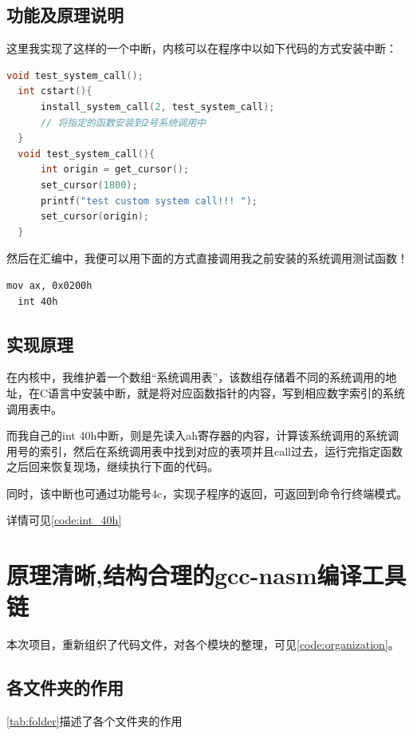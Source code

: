 \documentclass[forprint]{WHUBachelor}
\begin{document}
\subsection{功能及原理说明}

这里我实现了这样的一个中断，内核可以在程序中以如下代码的方式安装中断：
\begin{lstlisting}[language=c]
  void test_system_call();
  int cstart(){
      install_system_call(2, test_system_call);
      // 将指定的函数安装到2号系统调用中
  }
  void test_system_call(){
      int origin = get_cursor();
      set_cursor(1800);
      printf("test custom system call!!! ");
      set_cursor(origin);
  }
\end{lstlisting}

然后在汇编中，我便可以用下面的方式直接调用我之前安装的系统调用测试函数！

\begin{lstlisting}[language={[x86masm]Assembler}]
  mov ax, 0x0200h
  int 40h
\end{lstlisting}

\subsection{实现原理}

在内核中，我维护着一个数组“系统调用表”，该数组存储着不同的系统调用的地址，在C语言中安装中断，就是将对应函数指针的内容，写到相应数字索引的系统调用表中。

而我自己的int 40h中断，则是先读入ah寄存器的内容，计算该系统调用的系统调用号的索引，然后在系统调用表中找到对应的表项并且call过去，运行完指定函数之后回来恢复现场，继续执行下面的代码。

同时，该中断也可通过功能号4c，实现子程序的返回，可返回到命令行终端模式。

详情可见\autoref{code:int_40h}

\section{原理清晰,结构合理的gcc-nasm编译工具链}

本次项目，重新组织了代码文件，对各个模块的整理，可见\autoref{code:organization}。

\subsection{各文件夹的作用}

\autoref{tab:folder}描述了各个文件夹的作用
\end{document}
